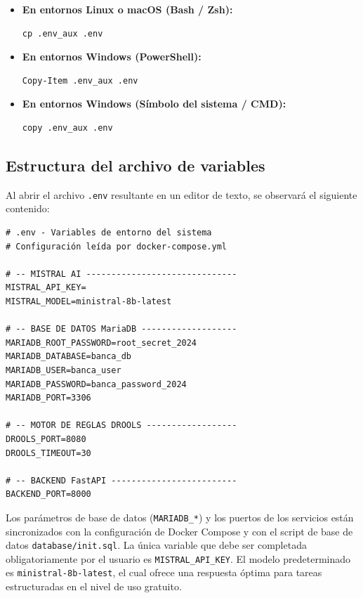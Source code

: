 \begin{itemize}
    \item \textbf{En entornos Linux o macOS (Bash / Zsh):}
\begin{verbatim}
cp .env_aux .env
\end{verbatim}

    \item \textbf{En entornos Windows (PowerShell):}
\begin{verbatim}
Copy-Item .env_aux .env
\end{verbatim}

    \item \textbf{En entornos Windows (Símbolo del sistema / CMD):}
\begin{verbatim}
copy .env_aux .env
\end{verbatim}
\end{itemize}

\subsection{Estructura del archivo de variables}

Al abrir el archivo \texttt{.env} resultante en un editor de texto, se observará el siguiente contenido:

\begin{verbatim}
# .env - Variables de entorno del sistema
# Configuración leída por docker-compose.yml

# -- MISTRAL AI ------------------------------
MISTRAL_API_KEY=
MISTRAL_MODEL=ministral-8b-latest

# -- BASE DE DATOS MariaDB -------------------
MARIADB_ROOT_PASSWORD=root_secret_2024
MARIADB_DATABASE=banca_db
MARIADB_USER=banca_user
MARIADB_PASSWORD=banca_password_2024
MARIADB_PORT=3306

# -- MOTOR DE REGLAS DROOLS ------------------
DROOLS_PORT=8080
DROOLS_TIMEOUT=30

# -- BACKEND FastAPI -------------------------
BACKEND_PORT=8000
\end{verbatim}

Los parámetros de base de datos (\texttt{MARIADB\_*}) y los puertos de los servicios están sincronizados con la configuración de Docker Compose y con el script de base de datos \texttt{database/init.sql}. La única variable que debe ser completada obligatoriamente por el usuario es \texttt{MISTRAL\_API\_KEY}. El modelo predeterminado es \texttt{ministral-8b-latest}, el cual ofrece una respuesta óptima para tareas estructuradas en el nivel de uso gratuito.

